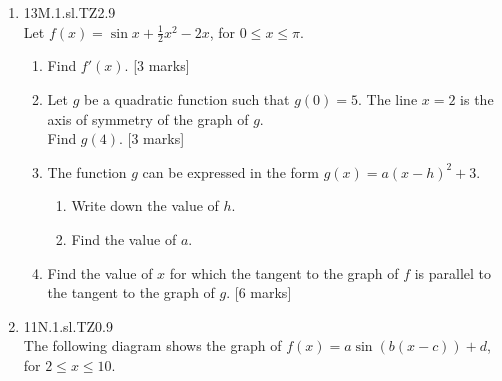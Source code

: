 \documentclass[12pt, twoside]{article}
\begin{document}
\begin{enumerate}
    \item 13M.1.sl.TZ2.9\\
    Let $f(x)=\sin x + \frac{1}{2} x^2 -2x$, for $0 \leq x \leq \pi$.
    \begin{enumerate}
      \item Find $f'(x)$. [3 marks]
      \item Let $g$ be a quadratic function such that $g(0)=5$. The line $x=2$ is the axis of symmetry of the graph of $g$.\\
      Find $g(4)$. [3 marks]
      \item The function $g$ can be expressed in the form $g(x)=a(x-h)^2+3$.
        \begin{enumerate}
          \item Write down the value of $h$.
          \item Find the value of $a$.
        \end{enumerate}
      \item Find the value of $x$ for which the tangent to the graph of $f$ is parallel to the tangent to the graph of $g$. [6 marks]
    \end{enumerate}

    \item 11N.1.sl.TZ0.9\\
    The following diagram shows the graph of $f(x)=a \sin (b(x-c))+d$, for $2 \leq x \leq 10$.
      \begin{center}
\end{center}
\end{enumerate}
\end{document}
